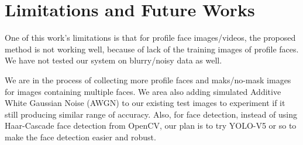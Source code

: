 \documentclass{svproc}
\begin{document}
\section{Limitations and Future Works}

One of this work's limitations is that for profile face images/videos, the proposed method is not working well, because of lack of the training images of profile faces. We have not tested our system on blurry/noisy data as well. \\

\par We are in the process of collecting more profile faces and maks/no-mask images for images containing multiple faces. We area also adding simulated Additive White Gaussian Noise (AWGN) to our existing test images to experiment if it still producing similar range of accuracy. Also, for face  detection, instead of using Haar-Cascade face detection from OpenCV, our plan is to try YOLO-V5 or so to make the face detection easier and robust.
%
%
\end{document}
